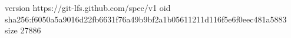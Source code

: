 version https://git-lfs.github.com/spec/v1
oid sha256:f6050a5a9016d22fb6631f76a49b9bf2a1b05611211d116f5e6f0eec481a5883
size 27886
